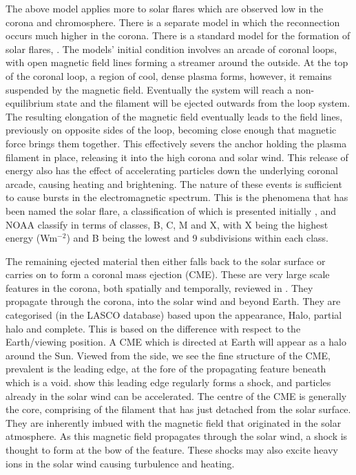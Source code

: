 The above model applies more to solar flares which are observed low in the corona and chromosphere. 
There is a separate model in which the reconnection occurs much higher in the corona.
There is a standard model for the formation of solar flares, \cite{Brown1980}.
The models' initial condition involves an arcade of coronal loops, with open magnetic field lines forming a streamer around the outside.
At the top of the coronal loop, a region of cool, dense plasma forms, however, it remains suspended by the magnetic field.
Eventually the system will reach a non-equilibrium state and the filament will be ejected outwards from the loop system.
The resulting elongation of the magnetic field eventually leads to the field lines, previously on opposite sides of the loop, becoming close enough that magnetic force brings them together.
This effectively severs the anchor holding the plasma filament in place, releasing it into the high corona and solar wind. 
This release of energy also has the effect of accelerating particles down the underlying coronal arcade, causing heating and brightening.
The nature of these events is sufficient to cause bursts in the electromagnetic spectrum.
This is the phenomena that has been named the solar flare, a classification of which is presented initially \cite{Bai1989}, and NOAA classify in terms of classes, B, C, M and X, with X being the highest energy (Wm$^{-2}$) and B being the lowest and 9 subdivisions within each class. 

The remaining ejected material then either falls back to the solar surface or carries on to form a coronal mass ejection (CME).
These are very large scale features in the corona, both spatially and temporally, reviewed in \cite{Chen2011}.
They propagate through the corona, into the solar wind and beyond Earth.
They are categorised (in the LASCO database) based upon the appearance, Halo, partial halo and complete.
This is based on the difference with respect to the Earth/viewing position. 
A CME which is directed at Earth will appear as a halo around the Sun.
Viewed from the side, we see the fine structure of the CME, prevalent is the leading edge, at the fore of the propagating feature beneath which is a void.
\cite{Manchester2011} show this leading edge regularly forms a shock, and particles already in the solar wind can be accelerated. 
The centre of the CME is generally the core, comprising of the filament that has just detached from the solar surface.
They are inherently imbued with the magnetic field that originated in the solar atmosphere.
As this magnetic field propagates through the solar wind, a shock is thought to form at the bow of the feature. 
These shocks may also excite heavy ions in the solar wind causing turbulence and heating.

